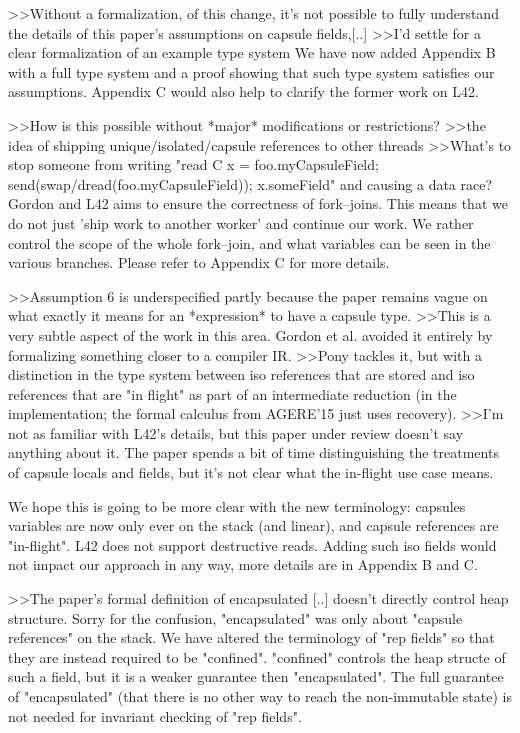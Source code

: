>>Without a formalization, of this change, it's not possible to fully understand the details of this paper's assumptions on capsule fields,[..]
>>I'd settle for a clear formalization of an example type system
We have now added Appendix B with a full type system and a proof showing that such type system satisfies our assumptions.
Appendix C would also help to clarify the former work on L42.


>>How is this possible without *major* modifications or restrictions?
>>the idea of shipping unique/isolated/capsule references to other threads
>>What's to stop someone from writing "read C x = foo.myCapsuleField; send(swap/dread(foo.myCapsuleField)); x.someField" and causing a data race?
Gordon and L42 aims to ensure the correctness of fork--joins. This means that we do not just 'ship work to another worker' and continue our work.
We rather control the scope of the whole fork--join, and what variables can be seen in the various branches. Please refer to Appendix C for more details.


>>Assumption 6 is underspecified partly because the paper remains vague on what exactly it means for an *expression* to have a capsule type.
>>This is a very subtle aspect of the work in this area. Gordon et al. avoided it entirely by formalizing something closer to a compiler IR.
>>Pony tackles it, but with a distinction in the type system between iso references that are stored and iso references that are "in flight" as part of an intermediate reduction (in the implementation; the formal calculus from AGERE'15 just uses recovery).
>>I'm not as familiar with L42's details, but this paper under review doesn't say anything about it. The paper spends a bit of time distinguishing the treatments of capsule locals and fields, but it's not clear what the in-flight use case means.

We hope this is going to be more clear with the new terminology: capsules variables are now only ever on the stack (and linear), and capsule references are "in-flight".
L42 does not support destructive reads. Adding such iso fields would not impact our approach in any way, more details are in Appendix B and C.

>>The paper's formal definition of encapsulated [..]  doesn't directly control heap structure.
Sorry for the confusion, "encapsulated" was only about "capsule references" on the stack.
We have altered the terminology of "rep fields" so that they are instead required to be "confined".
"confined" controls the heap structe of such a field, but it is a weaker guarantee then "encapsulated".
The full guarantee of "encapsulated" (that there is no other way to reach the non-immutable state) is not needed for invariant checking of "rep fields".



